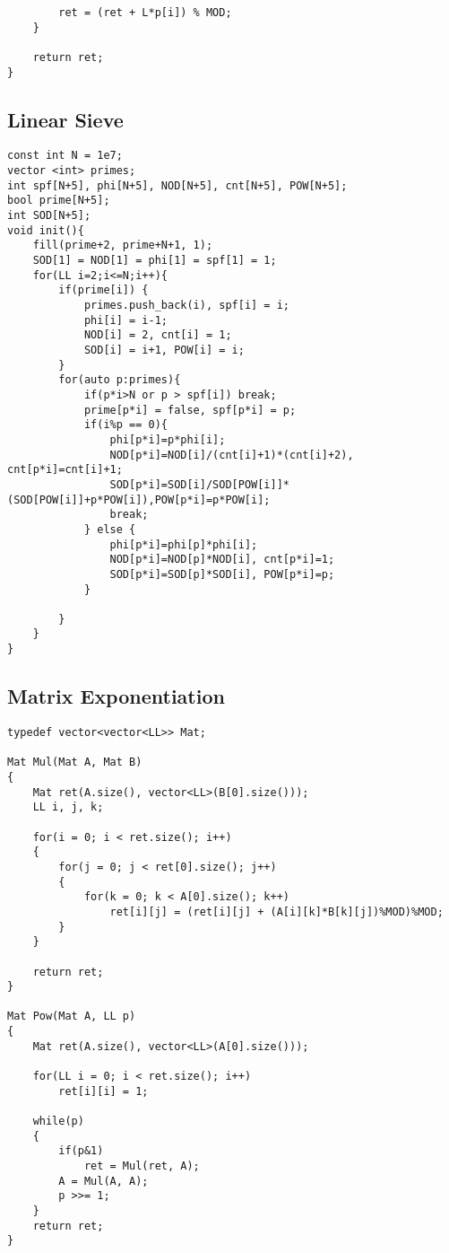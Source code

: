 \documentclass[FSZ,a4paper,onesided]{article}
\begin{document}
\begin{multicols*}{\COLS}
\begin{lstlisting}
        ret = (ret + L*p[i]) % MOD;
    }
 
    return ret;
}\end{lstlisting}
\subsection{Linear Sieve}
\begin{lstlisting}
const int N = 1e7;
vector <int> primes;
int spf[N+5], phi[N+5], NOD[N+5], cnt[N+5], POW[N+5]; 
bool prime[N+5];
int SOD[N+5];
void init(){
    fill(prime+2, prime+N+1, 1);
    SOD[1] = NOD[1] = phi[1] = spf[1] = 1;
    for(LL i=2;i<=N;i++){
        if(prime[i]) {
            primes.push_back(i), spf[i] = i;
            phi[i] = i-1;
            NOD[i] = 2, cnt[i] = 1;
            SOD[i] = i+1, POW[i] = i;
        }
        for(auto p:primes){
            if(p*i>N or p > spf[i]) break;
            prime[p*i] = false, spf[p*i] = p;
            if(i%p == 0){
                phi[p*i]=p*phi[i];
                NOD[p*i]=NOD[i]/(cnt[i]+1)*(cnt[i]+2), cnt[p*i]=cnt[i]+1;
                SOD[p*i]=SOD[i]/SOD[POW[i]]*(SOD[POW[i]]+p*POW[i]),POW[p*i]=p*POW[i];
                break;
            } else {
                phi[p*i]=phi[p]*phi[i];
                NOD[p*i]=NOD[p]*NOD[i], cnt[p*i]=1;
                SOD[p*i]=SOD[p]*SOD[i], POW[p*i]=p;
            }

        }
    }
}

\end{lstlisting}
\subsection{Matrix Exponentiation}
\begin{lstlisting}
typedef vector<vector<LL>> Mat;

Mat Mul(Mat A, Mat B)
{
    Mat ret(A.size(), vector<LL>(B[0].size()));
    LL i, j, k;

    for(i = 0; i < ret.size(); i++)
    {
        for(j = 0; j < ret[0].size(); j++)
        {
            for(k = 0; k < A[0].size(); k++)
                ret[i][j] = (ret[i][j] + (A[i][k]*B[k][j])%MOD)%MOD;
        }
    }

    return ret;
}

Mat Pow(Mat A, LL p)
{
    Mat ret(A.size(), vector<LL>(A[0].size()));

    for(LL i = 0; i < ret.size(); i++)
        ret[i][i] = 1;

    while(p)
    {
        if(p&1)
            ret = Mul(ret, A);
        A = Mul(A, A);
        p >>= 1;
    }
    return ret;
}
\end{lstlisting}

\end{multicols*}
\end{document}

